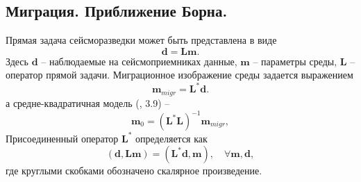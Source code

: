 \documentclass{article}
\newcommand  {\op      } [1]     { \bm{#1}           }
\renewcommand{\vec     } [1]     { \bm{#1}           }
\begin{document}
\subsection{Миграция. Приближение Борна.}

Прямая задача сейсморазведки может быть представлена в виде
\begin{equation} \label{dLm}
\vec d = \op L \vec m .
\end{equation}
Здесь $\vec d$ -- наблюдаемые на сейсмоприемниках данные, $\vec m$ -- параметры среды, $\op L$ -- оператор прямой задачи. Миграционное изображение среды задается выражением \cite{claerbout2004}
\begin{equation}
\vec m_{migr} = \op L^* \vec d .
\end{equation}
а средне-квадратичная модель (\cite{Zhdanov_2007}, 3.9) --
\begin{equation} \label{m_0}
\vec m_0 = \left( \op L^* \op L \right)^{-1} \vec m_{migr} ,
\end{equation}
Присоединенный оператор $\op L^*$ определяется как
\begin{equation}
\left(\vec d, \op L \vec m \right) = \left( \op L^* \vec d, \vec m \right),\quad \forall \vec m,\vec d ,
\end{equation}
где круглыми скобками обозначено скалярное произведение.
\end{document}
